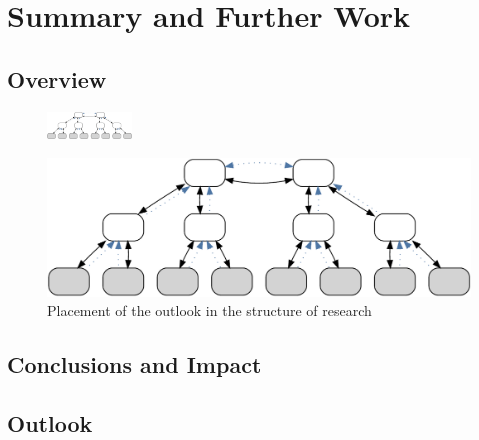 \cleardoublepage
\chapter{Summary and Further Work}\minitoc\label{sec:summary}\vspace{.5cm}

\section{Overview}

\begin{figure}
    \centering
    \includegraphics[width=0.2\textwidth]{resources/images/example3}
\end{figure}


\begin{figure}
    \centering
    \includegraphics[width=.55\textwidth]{resources/images/example3}
    \caption{Placement of the outlook in the structure of research}\label{fig:hourglass:outlook}
\end{figure}


\section{Conclusions and Impact}





\section{Outlook}


